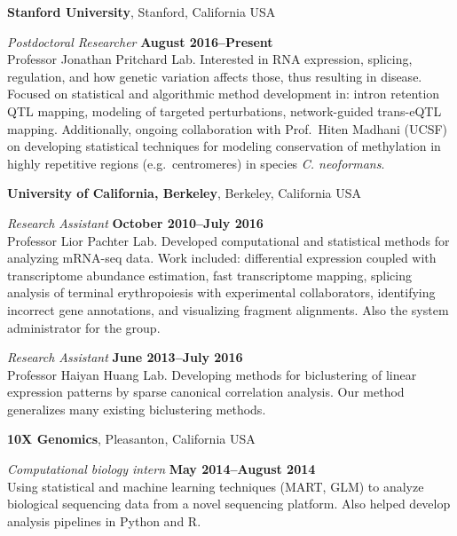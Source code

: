 \documentclass[11pt,notitlepage]{article} %
\begin{document}
\medskip

{\bf Stanford University}, Stanford, California USA

{\em Postdoctoral Researcher} \hfill {\bf August 2016--Present}\\
Professor Jonathan Pritchard Lab.
Interested in RNA expression, splicing, regulation, and how genetic variation affects those, thus resulting in disease.
Focused on statistical and algorithmic method development in: intron retention QTL mapping, modeling of targeted perturbations, network-guided trans-eQTL mapping.
Additionally, ongoing collaboration with Prof.\ Hiten Madhani (UCSF) on developing statistical techniques for modeling conservation of methylation in highly repetitive regions (e.g.\ centromeres) in species \textit{C. neoformans}.

\newpage

{\bf University of California, Berkeley}, Berkeley, California USA

{\em Research Assistant} \hfill {\bf October 2010--July 2016}\\
Professor Lior Pachter Lab.
Developed computational and statistical methods for analyzing mRNA-seq data.
Work included: differential expression coupled with transcriptome abundance estimation, fast transcriptome mapping, splicing analysis of terminal erythropoiesis with experimental collaborators, identifying incorrect gene annotations, and visualizing fragment alignments.
Also the system administrator for the group.

\medskip

{\em Research Assistant} \hfill {\bf June 2013--July 2016}\\
Professor Haiyan Huang Lab. Developing methods for biclustering of linear
expression patterns by sparse canonical correlation analysis. Our method
generalizes many existing biclustering methods.


\bigskip

{\bf 10X Genomics}, Pleasanton, California USA

{\em Computational biology intern} \hfill {\bf May 2014--August 2014}\\
Using statistical and machine learning techniques (MART, GLM) to analyze
biological sequencing data from a novel sequencing platform. Also helped
develop analysis pipelines in Python and R.

\bigskip
\end{document}
